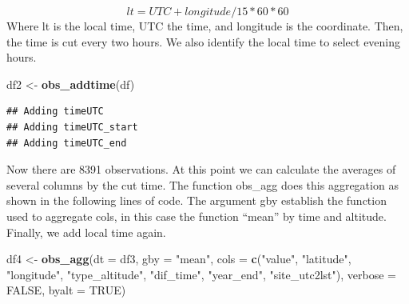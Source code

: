 \documentclass[preprint, 3p,
authoryear]{elsarticle} %
\newenvironment{Shaded}{\begin{snugshade}}{\end{snugshade}}
\newcommand{\AttributeTok}[1]{\textcolor[rgb]{0.13,0.29,0.53}{#1}}
\newcommand{\ConstantTok}[1]{\textcolor[rgb]{0.56,0.35,0.01}{#1}}
\newcommand{\DecValTok}[1]{\textcolor[rgb]{0.00,0.00,0.81}{#1}}
\newcommand{\FunctionTok}[1]{\textcolor[rgb]{0.13,0.29,0.53}{\textbf{#1}}}
\newcommand{\NormalTok}[1]{#1}
\newcommand{\OtherTok}[1]{\textcolor[rgb]{0.56,0.35,0.01}{#1}}
\newcommand{\SpecialCharTok}[1]{\textcolor[rgb]{0.81,0.36,0.00}{\textbf{#1}}}
\newcommand{\StringTok}[1]{\textcolor[rgb]{0.31,0.60,0.02}{#1}}
\begin{document}
\[
lt = UTC + longitude/15 * 60 * 60
\] Where lt is the local time, UTC the time, and longitude is the
coordinate. Then, the time is cut every two hours. We also identify the
local time to select evening hours.

\begin{Shaded}
\begin{Highlighting}[]
\NormalTok{df2 }\OtherTok{\textless{}{-}} \FunctionTok{obs\_addtime}\NormalTok{(df)}
\end{Highlighting}
\end{Shaded}

\begin{verbatim}
## Adding timeUTC
## Adding timeUTC_start
## Adding timeUTC_end
\end{verbatim}

\begin{Shaded}
\end{Shaded}

Now there are 8391 observations. At this point we can calculate the
averages of several columns by the cut time. The function obs\_agg does
this aggregation as shown in the following lines of code. The argument
gby establish the function used to aggregate cols, in this case the
function ``mean'' by time and altitude. Finally, we add local time
again.

\begin{Shaded}
\begin{Highlighting}[]
\NormalTok{df4 }\OtherTok{\textless{}{-}} \FunctionTok{obs\_agg}\NormalTok{(}\AttributeTok{dt =}\NormalTok{ df3,}
               \AttributeTok{gby =} \StringTok{"mean"}\NormalTok{,}
               \AttributeTok{cols =} \FunctionTok{c}\NormalTok{(}\StringTok{"value"}\NormalTok{, }\StringTok{"latitude"}\NormalTok{, }\StringTok{"longitude"}\NormalTok{, }\StringTok{"type\_altitude"}\NormalTok{,}
                        \StringTok{"dif\_time"}\NormalTok{, }\StringTok{"year\_end"}\NormalTok{, }\StringTok{"site\_utc2lst"}\NormalTok{),}
               \AttributeTok{verbose =} \ConstantTok{FALSE}\NormalTok{,}
               \AttributeTok{byalt =} \ConstantTok{TRUE}\NormalTok{)}
\end{Highlighting}
\end{Shaded}
\end{document}
